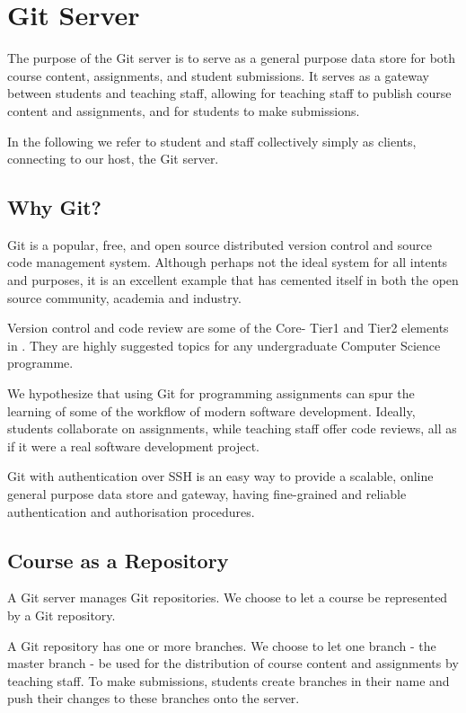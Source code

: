 
\section{Git Server}

The purpose of the Git server is to serve as a general purpose data store for
both course content, assignments, and student submissions. It serves as a
gateway between students and teaching staff, allowing for teaching staff to
publish course content and assignments, and for students to make submissions.

In the following we refer to student and staff collectively simply as clients,
connecting to our host, the Git server.

\subsection{Why Git?}

Git is a popular\cite{ohloh-2014}, free, and open source distributed version
control and source code management system\cite{git-2014}. Although perhaps not
the ideal system for all intents and purposes, it is an excellent example that
has cemented itself in both the open source community, academia and
industry\cite{gitprojects-2014}.

Version control and code review are some of the Core- Tier1 and Tier2 elements
in \cite{cs-curricula-2013}. They are highly suggested topics for any
undergraduate Computer Science programme.

We hypothesize that using Git for programming assignments can spur the learning
of some of the workflow of modern software development. Ideally, students
collaborate on assignments, while teaching staff offer code reviews, all as if
it were a real software development project.

Git with authentication over SSH is an easy way to provide a scalable, online
general purpose data store and gateway, having fine-grained and reliable
authentication and authorisation procedures.

\subsection{Course as a Repository}

A Git server manages Git repositories. We choose to let a course be represented
by a Git repository.

A Git repository has one or more branches. We choose to let one branch - the
master branch - be used for the distribution of course content and assignments
by teaching staff. To make submissions, students create branches in their name
and push their changes to these branches onto the server.

